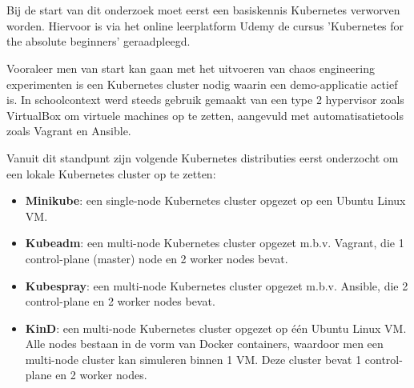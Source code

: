 
\chapter{}
\label{ch:methodologie}


Bij de start van dit onderzoek moet eerst een basiskennis Kubernetes verworven worden. Hiervoor is via het online leerplatform Udemy de cursus 'Kubernetes for the absolute beginners' geraadpleegd. \autocite{Mannambeth2021}  

Vooraleer men van start kan gaan met het uitvoeren van chaos engineering experimenten is een Kubernetes cluster nodig waarin een demo-applicatie actief is. In schoolcontext werd steeds gebruik gemaakt van een type 2 hypervisor zoals VirtualBox om virtuele machines op te zetten, aangevuld met automatisatietools zoals Vagrant en Ansible. 

Vanuit dit standpunt zijn volgende Kubernetes distributies eerst onderzocht om een lokale Kubernetes cluster op te zetten:
 
\begin{itemize}
    \item {\bf Minikube}: een single-node Kubernetes cluster opgezet op een Ubuntu Linux VM. 
    \item {\bf Kubeadm}: een multi-node Kubernetes cluster opgezet m.b.v. Vagrant, die 1 control-plane (master) node en 2 worker nodes bevat.
    \item {\bf Kubespray}: een multi-node Kubernetes cluster opgezet m.b.v. Ansible, die 2 control-plane en 2 worker nodes bevat.  
    \item {\bf KinD}: een multi-node Kubernetes cluster opgezet op één Ubuntu Linux VM. Alle nodes bestaan in de vorm van Docker containers, waardoor men een multi-node cluster kan simuleren binnen 1 VM. Deze cluster bevat 1 control-plane en 2 worker nodes.
\end{itemize}

